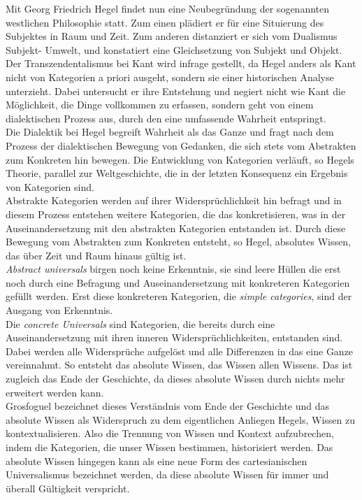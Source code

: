 Mit Georg Friedrich Hegel findet nun eine Neubegründung der sogenannten
westlichen Philosophie statt. Zum einen plädiert er für eine Situierung des
Subjektes in Raum und Zeit.\footnotemark {}
 Zum anderen distanziert er sich vom Dualismus
Subjekt- Umwelt, und konstatiert eine Gleichsetzung von Subjekt und Objekt. Der
Transzendentalismus bei Kant wird infrage gestellt, da Hegel anders als Kant
nicht von Kategorien a priori ausgeht, sondern sie einer historischen Analyse
unterzieht. Dabei untersucht er ihre Entstehung und negiert nicht wie Kant die
Möglichkeit, die Dinge vollkommen zu erfassen, sondern geht von einem
dialektischen Prozess aus, durch den eine umfassende Wahrheit entspringt.\footnotemark {}\\ 
Die Dialektik bei Hegel begreift Wahrheit als das Ganze und fragt nach dem
Prozess der dialektischen Bewegung von Gedanken, die sich stets vom Abstrakten
zum Konkreten hin bewegen. Die Entwicklung von Kategorien verläuft, so Hegels
Theorie, parallel zur Weltgeschichte, die in der letzten Konsequenz ein
Ergebnis von Kategorien sind.\footnotemark {}\\
Abstrakte Kategorien werden auf ihrer Widersprüchlichkeit hin befragt und in
diesem Prozess entstehen weitere Kategorien, die das konkretisieren, was in der
Auseinandersetzung mit den abstrakten Kategorien entstanden ist. Durch diese
Bewegung vom Abstrakten zum Konkreten entsteht, so Hegel, absolutes Wissen, das
über Zeit und Raum hinaus gültig ist.\\
\textit{Abstract universals} birgen noch keine
Erkenntnis, sie sind leere Hüllen die erst noch durch eine Befragung und
Auseinandersetzung mit konkreteren Kategorien gefüllt werden. Erst diese
konkreteren Kategorien, die \textit{simple categories}, sind der Ausgang von
Erkenntnis.\footnotemark {}\\
Die \textit{concrete Universals} sind Kategorien, die bereits durch eine
Auseinandersetzung mit ihren inneren Widersprüchlichkeiten, entstanden
sind.\footnotemark {} Dabei werden alle Widersprüche aufgelöst und alle Differenzen in das eine
Ganze vereinnahmt. So entsteht das absolute Wissen, das Wissen allen
Wissens.\footnotemark {} Das ist zugleich das Ende der Geschichte, da dieses absolute Wissen
durch nichts mehr erweitert werden kann.\\
 Grosfoguel bezeichnet dieses
Verständnis vom Ende der Geschichte und das absolute Wissen als Widerspruch zu
dem eigentlichen Anliegen Hegels, Wissen zu kontextualisieren. Also die
Trennung von Wissen und Kontext aufzubrechen, indem die Kategorien, die unser
Wissen bestimmen, historisiert werden. Das absolute Wissen hingegen kann als
eine neue Form des cartesianischen Universalismus bezeichnet werden, da diese
absolute Wissen für immer und überall Gültigkeit verspricht.\\


